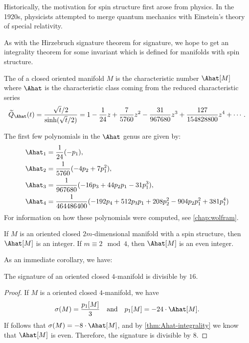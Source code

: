 \begin{remark}
	Historically, the motivation for spin structure first arose from physics. In the 1920s, physicists attempted to merge quantum mechanics with Einstein's theory of special relativity. 
\end{remark}

As with the Hirzebruch signature theorem for signature, we hope to get an integrality theorem for some invariant which is defined for manifolds with spin structure. 

\begin{definition}
	The  of a closed oriented manifold $M$ is the characteristic number $\Ahat[M]$ where $\Ahat$ is the characteristic class coming from the reduced characteristic series
	\[
		\widetilde{Q}_{\Ahat}(t) = \frac{\sqrt{t}/2}{\sinh(\sqrt{t}/2)} = 1 - \frac{1}{24} z + \frac{7}{5760} z^2 - \frac{31}{967680} z^3 + \frac{127}{154828800}z^4+\cdots.
	\]
\end{definition}

\begin{example}
	The first few polynomials in the $\Ahat$ genus are given by:
\[
	\begin{aligned}
		\Ahat_1 &= \frac{1}{24}(-p_1),\\
		\Ahat_2 &= \frac{1}{5760}(-4p_2 + 7p_1^2),\\
		\Ahat_3 &= \frac{1}{967680}(-16p_3+44p_2p_1-31p_1^3),\\
		\Ahat_4 &= \frac{1}{464486400}(-192p_4+512p_3p_1+208p_2^2-904p_2p_1^2+381p_1^4)
	\end{aligned}
\]
	For information on how these polynomials were computed, see \cref{chap:wolfram}.
\end{example}

\begin{theorem}\label{thm:Ahat-integrality}
	If $M$ is an oriented closed $2m$-dimensional manifold with a spin structure, then $\Ahat[M]$ is an integer. If $m\equiv 2\mod 4$, then $\Ahat[M]$ is an even integer.
\end{theorem}

As an immediate corollary, we have:

\begin{theorem}[Rochlin]\label{thm:rochlin}
	The signature of an oriented closed $4$-manifold is divisible by $16$.
\end{theorem}
\begin{proof}
	If $M$ is a oriented closed $4$-manifold, we have
	\[
		\sigma(M) = \frac{p_1[M]}{3}\quad\textrm{and}\quad p_1[M] = -24\cdot\Ahat[M].
	\]
	If follows that $\sigma(M)=-8\cdot\Ahat[M]$, and by \cref{thm:Ahat-integrality} we know that $\Ahat[M]$ is even. Therefore, the signature is divisible by $8$.
\end{proof}


